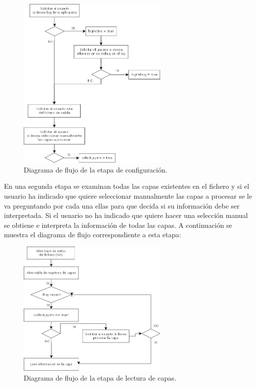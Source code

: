 \begin{itemize}
\begin{figure}[H]
\begin{center}
\includegraphics[width=0.65\textwidth]{imgs/diagramaFlujo}
\caption{Diagrama de flujo de la etapa de configuración.}
\end{center}
\end{figure}

En una segunda etapa se examinan todas las capas existentes en el fichero y si el usuario ha indicado que quiere seleccionar manualmente las capas a procesar se le va preguntando por cada una ellas para que decida si su información debe ser interpretada. Si el usuario no ha indicado que quiere hacer una selección manual se obtiene e interpreta la información de todas las capas. A continuación se muestra el diagrama de flujo correspondiente a esta etapa:

\begin{figure}[H]
\begin{center}
\includegraphics[width=0.65\textwidth]{imgs/diagramaFlujo2}
\caption{Diagrama de flujo de la etapa de lectura de capas.}
\end{center}
\end{figure}


\end{itemize}
